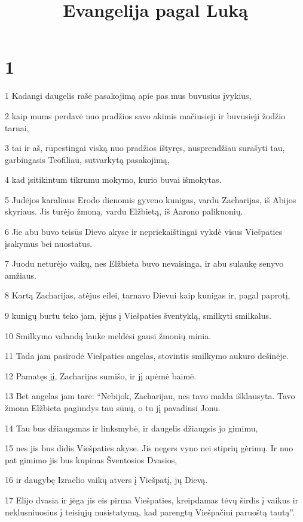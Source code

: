 

\title{Evangelija pagal Luką}

\chapter{1}


\par 1 Kadangi daugelis rašė pasakojimą apie pas mus buvusius įvykius, 
\par 2 kaip mums perdavė nuo pradžios savo akimis mačiusieji ir buvusieji žodžio tarnai, 
\par 3 tai ir aš, rūpestingai viską nuo pradžios ištyręs, nusprendžiau surašyti tau, garbingasis Teofiliau, sutvarkytą pasakojimą, 
\par 4 kad įsitikintum tikrumu mokymo, kurio buvai išmokytas. 
\par 5 Judėjos karaliaus Erodo dienomis gyveno kunigas, vardu Zacharijas, iš Abijos skyriaus. Jis turėjo žmoną, vardu Elžbietą, iš Aarono palikuonių. 
\par 6 Jie abu buvo teisūs Dievo akyse ir nepriekaištingai vykdė visus Viešpaties įsakymus bei nuostatus. 
\par 7 Juodu neturėjo vaikų, nes Elžbieta buvo nevaisinga, ir abu sulaukę senyvo amžiaus. 
\par 8 Kartą Zacharijas, atėjus eilei, tarnavo Dievui kaip kunigas ir, pagal paprotį, 
\par 9 kunigų burtu teko jam, įėjus į Viešpaties šventyklą, smilkyti smilkalus. 
\par 10 Smilkymo valandą lauke meldėsi gausi žmonių minia. 
\par 11 Tada jam pasirodė Viešpaties angelas, stovintis smilkymo aukuro dešinėje. 
\par 12 Pamatęs jį, Zacharijas sumišo, ir jį apėmė baimė. 
\par 13 Bet angelas jam tarė: “Nebijok, Zacharijau, nes tavo malda išklausyta. Tavo žmona Elžbieta pagimdys tau sūnų, o tu jį pavadinsi Jonu. 
\par 14 Tau bus džiaugsmas ir linksmybė, ir daugelis džiaugsis jo gimimu, 
\par 15 nes jis bus didis Viešpaties akyse. Jis negers vyno nei stiprių gėrimų. Ir nuo pat gimimo jis bus kupinas Šventosios Dvasios, 
\par 16 ir daugybę Izraelio vaikų atvers į Viešpatį, jų Dievą. 
\par 17 Elijo dvasia ir jėga jis eis pirma Viešpaties, kreipdamas tėvų širdis į vaikus ir neklusniuosius į teisiųjų nusistatymą, kad parengtų Viešpačiui paruoštą tautą”. 
